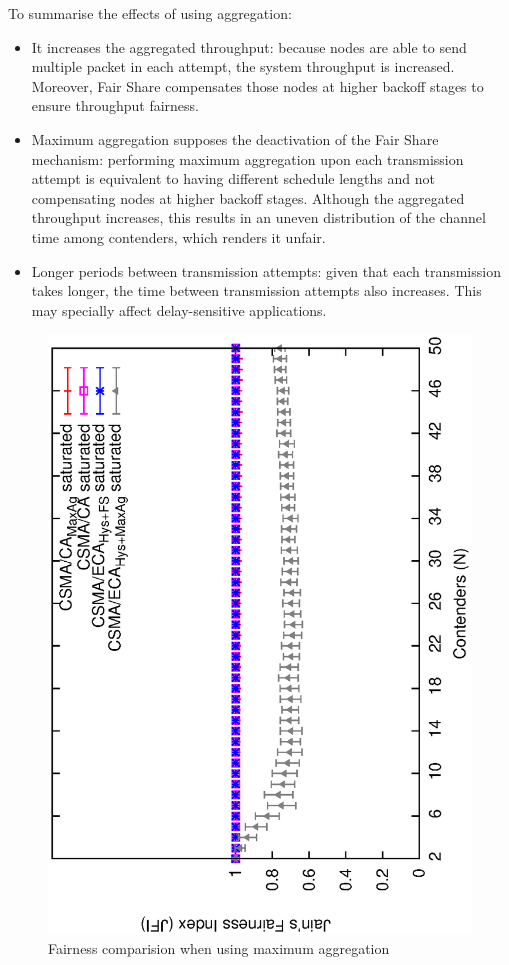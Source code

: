 \documentclass[a4paper,journal]{IEEEtran}
\begin{document}
	To summarise the effects of using aggregation:
	\begin{itemize}
		\item It increases the aggregated throughput: because nodes are able to send multiple packet in each attempt, the system throughput is increased. Moreover, Fair Share compensates those nodes at higher backoff stages to ensure throughput fairness.
		\item Maximum aggregation supposes the deactivation of the Fair Share mechanism: performing maximum aggregation upon each transmission attempt is equivalent to having different schedule lengths and not compensating nodes at higher backoff stages. Although the aggregated throughput increases, this results in an uneven distribution of the channel time among contenders, which renders it unfair.
		\item Longer periods between transmission attempts: given that each transmission takes longer, the time between transmission attempts also increases. This may specially affect delay-sensitive applications.
	\end{itemize}

	\begin{figure}[tb]
	\centering
		\includegraphics[width=0.7\linewidth,angle=-90]{figures/fairness-max-Ag/fairness-maxAg-combined.eps}
		\caption{Fairness comparision when using maximum aggregation}
		\label{fig:fairness-with-maximum-aggregation}
	\end{figure}
	
\end{document}
